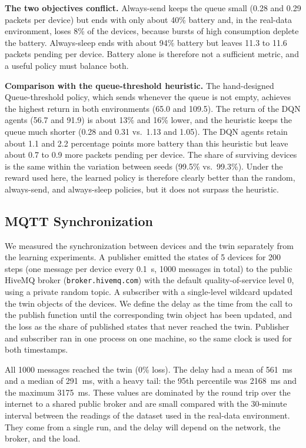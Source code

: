\documentclass[conference]{IEEEtran}
\begin{document}
\textbf{The two objectives conflict.} Always-send keeps the queue small (0.28 and 0.29 packets per device) but ends with only about 40\% battery and, in the real-data environment, loses 8\% of the devices, because bursts of high consumption deplete the battery. Always-sleep ends with about 94\% battery but leaves 11.3 to 11.6 packets pending per device. Battery alone is therefore not a sufficient metric, and a useful policy must balance both.

\textbf{Comparison with the queue-threshold heuristic.} The hand-designed Queue-threshold policy, which sends whenever the queue is not empty, achieves the highest return in both environments (65.0 and 109.5). The return of the DQN agents (56.7 and 91.9) is about 13\% and 16\% lower, and the heuristic keeps the queue much shorter (0.28 and 0.31 vs.\ 1.13 and 1.05). The DQN agents retain about 1.1 and 2.2 percentage points more battery than this heuristic but leave about 0.7 to 0.9 more packets pending per device. The share of surviving devices is the same within the variation between seeds (99.5\% vs.\ 99.3\%). Under the reward used here, the learned policy is therefore clearly better than the random, always-send, and always-sleep policies, but it does not surpass the heuristic.

\subsection{MQTT Synchronization}
\label{sec:mqtt}
We measured the synchronization between devices and the twin separately from the learning experiments. A publisher emitted the states of 5 devices for 200 steps (one message per device every 0.1~s, 1000 messages in total) to the public HiveMQ broker (\texttt{broker.hivemq.com}) with the default quality-of-service level 0, using a private random topic. A subscriber with a single-level wildcard updated the twin objects of the devices. We define the delay as the time from the call to the publish function until the corresponding twin object has been updated, and the loss as the share of published states that never reached the twin. Publisher and subscriber ran in one process on one machine, so the same clock is used for both timestamps.

All 1000 messages reached the twin (0\% loss). The delay had a mean of 561~ms and a median of 291~ms, with a heavy tail: the 95th percentile was 2168~ms and the maximum 3175~ms. These values are dominated by the round trip over the internet to a shared public broker and are small compared with the 30-minute interval between the readings of the dataset used in the real-data environment. They come from a single run, and the delay will depend on the network, the broker, and the load.
\end{document}
